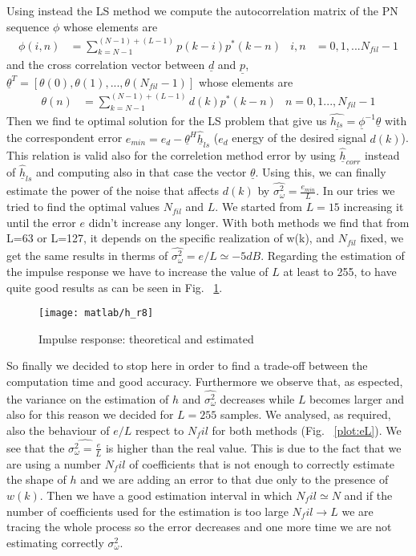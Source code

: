 \documentclass[a4paper,oneside]{article}
\renewcommand{\vec}[1]{\underline{#1}}
\begin{document}
Using instead the LS method we compute the autocorrelation matrix of the PN sequence $\phi$ whose elements are 
\begin{align*}
\phi(i,n) &= \sum_{k=N-1}^{(N-1) + (L-1)}{p(k-i)p^*(k-n)}&
i,n&=0,1,...N_{fil} -1
\end{align*}
and the cross correlation vector between $\vec{d}$ and $\vec{p}$, $\vec{\theta}^T = [\theta(0), \theta(1),..., \theta(N_{fil}-1)]$ whose elements are
\begin{align*}
\theta(n)& = \sum_{k=N-1}^{(N-1) + (L-1)}{d(k)p^*(k-n)}& n=0,1...,N_{fil}-1
\end{align*}
Then we find te optimal solution for the LS problem that give us  $\vec{\hat{h_{ls}}} = \vec{\phi}^{-1} \vec{\theta}$ with the correspondent error 
$ e_{min} = e_d - \vec{\theta}^H \vec{\hat{h}}_{ls}$ ($e_d$ energy of the desired signal $d(k)$). This relation is valid also for the correletion method error by using $\vec{\hat{h}}_{corr}$ instead of $\vec{\hat{h}}_{ls}$ and computing also in that case the vector $\vec{\theta}$.  Using this, we can finally estimate the power of the noise that affects $d(k)$ by $\hat{\sigma_\omega^2} = \frac{e_{min}}{L}$.
\newline In our tries we tried to find the optimal values $N_{fil}$ and $L$. We started from $L = 15$ increasing it until the error $e$ didn't increase any longer. With both methods we find that from L=63 or L=127, it depends on the specific realization of w(k), and $N_{fil}$ fixed, we get the same results in therms of $\hat{\sigma_\omega^2} = e/L\simeq -5 dB$. Regarding the estimation of the impulse response we have to increase the value of $L$ at least to 255, to have quite good results as can be seen in Fig. ~\ref{plot:h}.
\begin{figure}[htbp]
  \centering
  \texttt{[image: matlab/h\_r8]}
  \caption{Impulse response: theoretical and estimated}
    \label{plot:h}
\end{figure}
So finally we decided to stop here in order to find a trade-off between the computation time and good accuracy. Furthermore we observe that, as espected, the variance on the estimation of $h$ and $\hat{\sigma_\omega^2}$ decreases while $L$ becomes larger and also for this reason we decided for $L=255$ samples.
We analysed, as required, also the behaviour of $e/L$ respect to $N_fil$ for both methods (Fig. ~\ref{plot:eL}). We see that the $\hat{\sigma_\omega^2 = \frac{e}{L}}$ is higher than the real value. This is due to the fact that we are using a number $N_fil$ of coefficients that is not enough to correctly estimate the shape of $h$ and we are adding an error to that due only to the presence of $w(k)$. Then we have a good estimation interval in which $N_fil \simeq N$ and if the number of coefficients used for the estimation is too large $N_fil \longrightarrow L$ we are tracing the whole process so the error decreases and one more time we are not estimating correctly $\sigma_\omega^2$.
\end{document}

